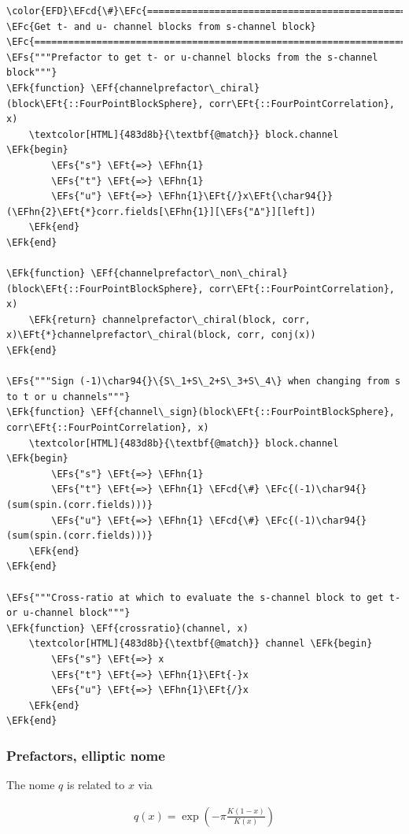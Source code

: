 \documentclass[a4paper]{article}
\numberwithin{equation}{section}
\newcommand{\EFc}[1]{\textcolor{EFc}{#1}} %
\newcommand{\EFcd}[1]{\textcolor{EFcd}{#1}} %
\newcommand{\EFs}[1]{\textcolor{EFs}{#1}} %
\newcommand{\EFk}[1]{\textcolor{EFk}{#1}} %
\newcommand{\EFf}[1]{\textcolor{EFf}{#1}} %
\newcommand{\EFt}[1]{\textcolor{EFt}{#1}} %
\newcommand{\EFhn}[1]{\textcolor{EFhn}{#1}} %
\begin{document}
\begin{Code}
\begin{Verbatim}
\color{EFD}\EFcd{\#}\EFc{===========================================================================================}
\EFc{Get t- and u- channel blocks from s-channel block}
\EFc{===========================================================================================\#}
\EFs{"""Prefactor to get t- or u-channel blocks from the s-channel block"""}
\EFk{function} \EFf{channelprefactor\_chiral}(block\EFt{::FourPointBlockSphere}, corr\EFt{::FourPointCorrelation}, x)
    \textcolor[HTML]{483d8b}{\textbf{@match}} block.channel \EFk{begin}
        \EFs{"s"} \EFt{=>} \EFhn{1}
        \EFs{"t"} \EFt{=>} \EFhn{1}
        \EFs{"u"} \EFt{=>} \EFhn{1}\EFt{/}x\EFt{\char94{}}(\EFhn{2}\EFt{*}corr.fields[\EFhn{1}][\EFs{"Δ"}][left])
    \EFk{end}
\EFk{end}

\EFk{function} \EFf{channelprefactor\_non\_chiral}(block\EFt{::FourPointBlockSphere}, corr\EFt{::FourPointCorrelation}, x)
    \EFk{return} channelprefactor\_chiral(block, corr, x)\EFt{*}channelprefactor\_chiral(block, corr, conj(x))
\EFk{end}

\EFs{"""Sign (-1)\char94{}\{S\_1+S\_2+S\_3+S\_4\} when changing from s to t or u channels"""}
\EFk{function} \EFf{channel\_sign}(block\EFt{::FourPointBlockSphere}, corr\EFt{::FourPointCorrelation}, x)
    \textcolor[HTML]{483d8b}{\textbf{@match}} block.channel \EFk{begin}
        \EFs{"s"} \EFt{=>} \EFhn{1}
        \EFs{"t"} \EFt{=>} \EFhn{1} \EFcd{\#} \EFc{(-1)\char94{}(sum(spin.(corr.fields)))}
        \EFs{"u"} \EFt{=>} \EFhn{1} \EFcd{\#} \EFc{(-1)\char94{}(sum(spin.(corr.fields)))}
    \EFk{end}
\EFk{end}

\EFs{"""Cross-ratio at which to evaluate the s-channel block to get t- or u-channel block"""}
\EFk{function} \EFf{crossratio}(channel, x)
    \textcolor[HTML]{483d8b}{\textbf{@match}} channel \EFk{begin}
        \EFs{"s"} \EFt{=>} x
        \EFs{"t"} \EFt{=>} \EFhn{1}\EFt{-}x
        \EFs{"u"} \EFt{=>} \EFhn{1}\EFt{/}x
    \EFk{end}
\EFk{end}
\end{Verbatim}
\end{Code}
\subsubsection*{Prefactors, elliptic nome}
\label{sec:orgeeedcc9}

The nome \(q\) is related to \(x\) via

\begin{align}
q(x) = \exp(-\pi \frac{K(1-x)}{K(x)})
\end{align}
\end{document}
